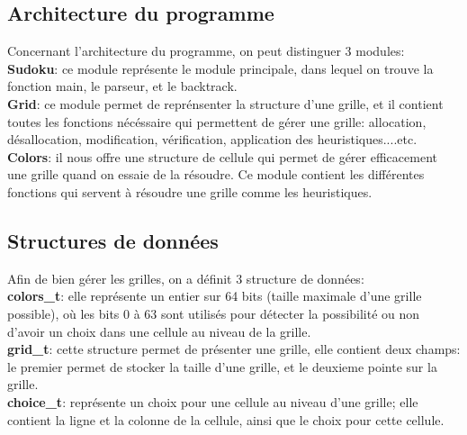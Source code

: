 \documentclass[12pt]{article}
\begin{document}
	  \subsection{Architecture du programme}
	Concernant l'architecture du programme, on peut distinguer 3 modules:\\
	\textbf{Sudoku}: ce module représente le module principale, dans lequel on trouve la fonction main, le parseur, et le backtrack.\\
    \textbf{Grid}: ce module permet de reprénsenter la structure d'une grille, et il contient toutes les fonctions nécéssaire qui permettent de gérer une grille: allocation, désallocation, modification, vérification, application des heuristiques....etc.\\
    \textbf{Colors}: il nous offre une structure de cellule qui permet de gérer efficacement une grille quand on essaie de la résoudre. Ce module contient les différentes fonctions qui servent à résoudre une grille comme les heuristiques.

    \subsection{Structures de données}
	Afin de bien gérer les grilles, on a définit 3 structure de données:\\
    \textbf{colors\_t}: elle représente un entier sur 64 bits (taille maximale d'une grille possible), où les bits 0 à 63 sont utilisés pour détecter la possibilité ou non d'avoir un choix dans une cellule au niveau de la grille.\\
    \textbf{grid\_t}: cette structure permet de présenter une grille, elle contient deux champs: le premier permet de stocker la taille d'une grille, et le deuxieme pointe sur la grille.\\
    \textbf{choice\_t}: représente un choix pour une cellule au niveau d'une grille; elle contient la ligne et la colonne de la cellule, ainsi que le choix pour cette cellule. 
    
\end{document}
